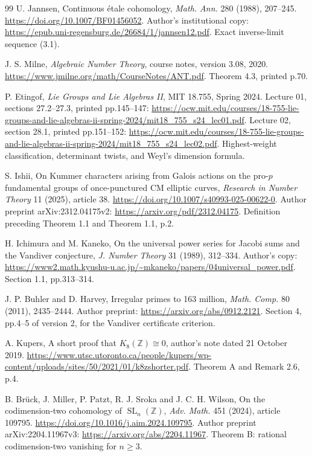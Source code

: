 \documentclass[11pt,a4paper]{article}
\theoremstyle{definition}
\begin{document}
\begin{thebibliography}{99}
U. Jannsen, Continuous \'etale cohomology,
\emph{Math. Ann.} 280 (1988), 207--245.
\url{https://doi.org/10.1007/BF01456052}.
Author's institutional copy:
\url{https://epub.uni-regensburg.de/26684/1/jannsen12.pdf}.
Exact inverse-limit sequence (3.1).


J. S. Milne, \emph{Algebraic Number Theory},
course notes, version 3.08, 2020.
\url{https://www.jmilne.org/math/CourseNotes/ANT.pdf}.
Theorem 4.3, printed p.70.


P. Etingof, \emph{Lie Groups and Lie Algebras II},
MIT 18.755, Spring 2024.
Lecture 01, sections 27.2--27.3, printed pp.145--147:
\url{https://ocw.mit.edu/courses/18-755-lie-groups-and-lie-algebras-ii-spring-2024/mit18_755_s24_lec01.pdf}.
Lecture 02, section 28.1, printed pp.151--152:
\url{https://ocw.mit.edu/courses/18-755-lie-groups-and-lie-algebras-ii-spring-2024/mit18_755_s24_lec02.pdf}.
Highest-weight classification, determinant twists, and Weyl's dimension formula.


S. Ishii,
On Kummer characters arising from Galois actions on the pro-\(p\)
fundamental groups of once-punctured CM elliptic curves,
\emph{Research in Number Theory} 11 (2025), article 38.
\url{https://doi.org/10.1007/s40993-025-00622-0}.
Author preprint arXiv:2312.04175v2:
\url{https://arxiv.org/pdf/2312.04175}.
Definition preceding Theorem 1.1 and Theorem 1.1, p.2.


H. Ichimura and M. Kaneko,
On the universal power series for Jacobi sums and the Vandiver conjecture,
\emph{J. Number Theory} 31 (1989), 312--334.
Author's copy:
\url{https://www2.math.kyushu-u.ac.jp/~mkaneko/papers/04universal_power.pdf}.
Section 1.1, pp.313--314.


J. P. Buhler and D. Harvey,
Irregular primes to 163 million,
\emph{Math. Comp.} 80 (2011), 2435--2444.
Author preprint:
\url{https://arxiv.org/abs/0912.2121}.
Section 4, pp.4--5 of version 2, for the Vandiver certificate criterion.


A. Kupers, A short proof that \(K_8(\mathbb Z)\cong0\),
author's note dated 21 October 2019.
\url{https://www.utsc.utoronto.ca/people/kupers/wp-content/uploads/sites/50/2021/01/k8zshorter.pdf}.
Theorem A and Remark 2.6, p.4.


B. Br\"uck, J. Miller, P. Patzt, R. J. Sroka and J. C. H. Wilson,
On the codimension-two cohomology of \(\operatorname{SL}_n(\mathbb Z)\),
\emph{Adv. Math.} 451 (2024), article 109795.
\url{https://doi.org/10.1016/j.aim.2024.109795}.
Author preprint arXiv:2204.11967v3:
\url{https://arxiv.org/abs/2204.11967}.
Theorem B: rational codimension-two vanishing for \(n\ge3\).


\end{thebibliography}
\end{document}
